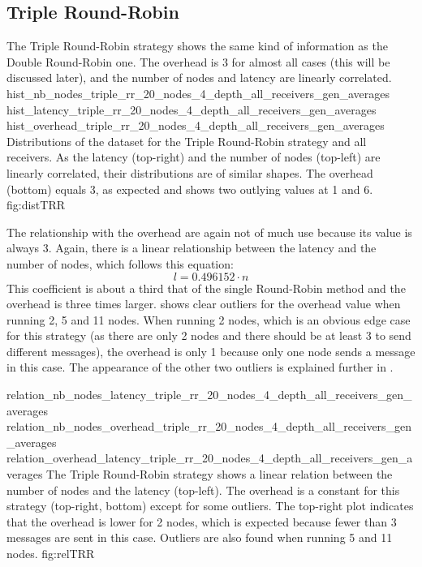 \FloatBarrier
\subsection{Triple Round-Robin}
\label{ssec:tripleRR}
The Triple Round-Robin strategy shows  the same kind of information as the
Double Round-Robin one. The overhead is 3 for almost all cases (this will be
discussed later), and the number of nodes and latency are linearly correlated.
\triplefigure
    {hist_nb_nodes_triple_rr_20_nodes_4_depth_all_receivers_gen_averages}
    {hist_latency_triple_rr_20_nodes_4_depth_all_receivers_gen_averages}
    {hist_overhead_triple_rr_20_nodes_4_depth_all_receivers_gen_averages}
    {Distributions of the dataset for the Triple Round-Robin strategy and all
    receivers. As the latency (top-right) and the number of nodes (top-left) are
    linearly correlated, their distributions are of similar shapes. The
    overhead (bottom) equals 3, as expected and shows two outlying values at 1
    and 6.}
    {fig:distTRR}

The relationship with the overhead are again not of much use because its value
is always 3. Again, there is a linear relationship between the latency and the
number of nodes, which follows this equation:
    \[l = 0.496152 \cdot n\]
This coefficient is about a third that of the single Round-Robin method and the
overhead is three times larger.
 shows clear outliers for the overhead value when running
2, 5 and 11 nodes. When running 2 nodes, which is an obvious edge case for this
strategy (as there are only 2 nodes and there should be at least 3 to send
different messages), the overhead is only 1 because only one node sends a
message in this case. The appearance of the other two outliers is explained further in
. 

\triplefigure
    {relation_nb_nodes_latency_triple_rr_20_nodes_4_depth_all_receivers_gen_averages}
    {relation_nb_nodes_overhead_triple_rr_20_nodes_4_depth_all_receivers_gen_averages}
    {relation_overhead_latency_triple_rr_20_nodes_4_depth_all_receivers_gen_averages}
    {The Triple Round-Robin strategy shows a linear relation between the number of
    nodes and the latency (top-left). The overhead is a constant for this
    strategy (top-right, bottom) except for some outliers. The top-right plot
    indicates that the overhead is lower for 2 nodes, which is expected because
    fewer than 3 messages are sent in this case. Outliers are also found when
    running 5 and 11 nodes.}
    {fig:relTRR}

